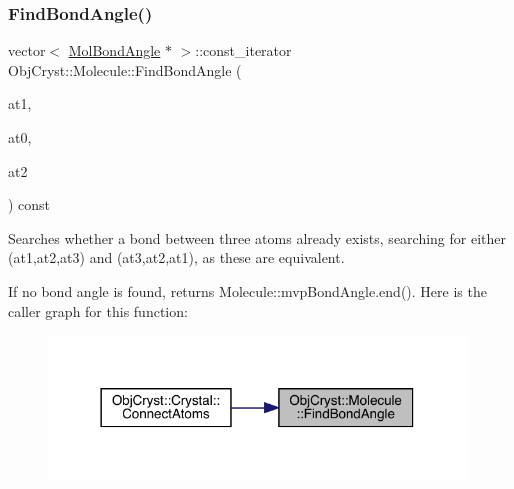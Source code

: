 \subsubsection{\texorpdfstring{FindBondAngle()}{FindBondAngle()}}
{\footnotesize\ttfamily vector$<$ \mbox{\hyperlink{class_obj_cryst_1_1_mol_bond_angle}{Mol\+Bond\+Angle}} $\ast$ $>$\+::const\+\_\+iterator Obj\+Cryst\+::\+Molecule\+::\+Find\+Bond\+Angle (\begin{DoxyParamCaption}\item[{const \mbox{\hyperlink{class_obj_cryst_1_1_mol_atom}{Mol\+Atom}} \&}]{at1,  }\item[{const \mbox{\hyperlink{class_obj_cryst_1_1_mol_atom}{Mol\+Atom}} \&}]{at0,  }\item[{const \mbox{\hyperlink{class_obj_cryst_1_1_mol_atom}{Mol\+Atom}} \&}]{at2 }\end{DoxyParamCaption}) const}

Searches whether a bond between three atoms already exists, searching for either (at1,at2,at3) and (at3,at2,at1), as these are equivalent.

If no bond angle is found, returns Molecule\+::mvp\+Bond\+Angle.\+end(). Here is the caller graph for this function\+:
\nopagebreak
\begin{figure}[H]
\begin{center}
\leavevmode
\includegraphics[width=314pt]{class_obj_cryst_1_1_molecule_a5a9a7cfad7693ce55fa20be38f1a92c1_icgraph}
\end{center}
\end{figure}
\mbox{\label{class_obj_cryst_1_1_molecule_a6bc7da1865f3fd5adc42323fc44d292c}} 
